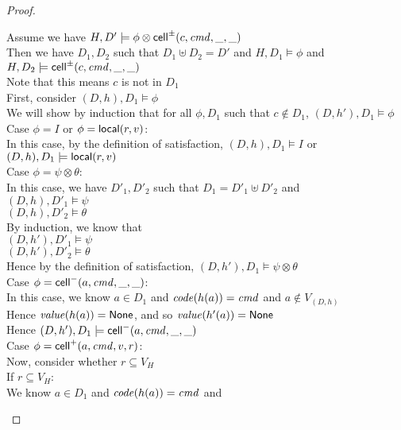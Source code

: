 \begin{proof}
\begin{tabbedproof}
\oo Assume we have $H, D' \models \phi \otimes \mathsf{cell}^{\pm}({c}, {\mathit{cmd}}, {\_}, {\_})$ \\
\oo Then we have $D_1, D_2$ such that $D_1 \uplus D_2 = D'$ and $H, D_1 \models \phi$ and $H, D_2 \models \mathsf{cell}^{\pm}({c}, {\mathit{cmd}}, {\_}, {\_})$ \\
\oo Note that this means $c$ is not in $D_1$ \\
\oo First, consider $(D,h), D_1 \models \phi$ \\
\ooo We will show by induction that for all $\phi, D_1$ such that $c \not\in D_1$, $(D,h'), D_1 \models \phi$ \\
\ooo Case $\phi = I$ or $\phi = \mathsf{local}({r}, {v})$: \\
\oooo In this case, by the definition of satisfaction, $(D,h), D_1 \models I$ or $(D,h), D_1 \models \mathsf{local}({r}, {v})$\\
\ooo Case $\phi = \psi \otimes \theta$: \\
\oooo In this case, we have $D'_1, D'_2$ such that $D_1 = D'_1 \uplus D'_2$ and \\
\oooox $(D,h), D'_1 \models \psi$ \\
\oooox $(D,h), D'_2 \models \theta$ \\
\oooo By induction, we know that \\
\oooox $(D,h'), D'_1 \models \psi$ \\
\oooox $(D,h'), D'_2 \models \theta$ \\
\oooo Hence by the definition of satisfaction, $(D,h'), D_1 \models \psi \otimes \theta$ \\
\ooo Case $\phi = \mathsf{cell}^{-}({a}, {\mathit{cmd}}, {\_}, {\_})$: \\
\oooo In this case, we know $a \in D_1$ and $\mathit{code}(h(a)) = \mathit{cmd}$ and $a \not\in V_{(D,h)}$ \\
\oooo Hence $\mathit{value}(h(a)) = \mathsf{None}$, and so $\mathit{value}(h'(a)) = \mathsf{None}$ \\
\oooo Hence $(D,h'), D_1 \models \mathsf{cell}^{-}({a}, {\mathit{cmd}}, {\_}, {\_})$ \\
\ooo Case $\phi = \mathsf{cell}^{+}({a}, {\mathit{cmd}}, {v}, {r})$: \\
\oooo Now, consider whether $r \subseteq V_H$ \\
\oooo If $r \subseteq V_H$: \\
\ooooo We know $a \in D_1$ and $\mathit{code}(h(a)) = \mathit{cmd}$ and 

\end{tabbedproof}
\end{proof}
